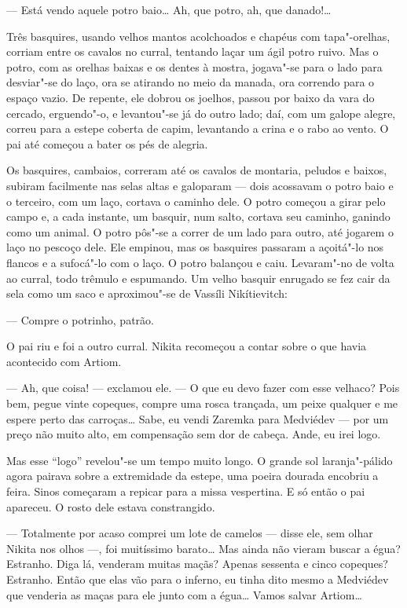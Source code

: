 --- Está vendo aquele potro baio\ldots{} Ah, que potro, ah, que danado!\ldots{}

Três basquires, usando velhos mantos acolchoados e chapéus com
tapa"-orelhas, corriam entre os cavalos no curral, tentando laçar um ágil
potro ruivo. Mas o potro, com as orelhas baixas e os dentes à mostra,
jogava"-se para o lado para desviar"-se do laço, ora se atirando no meio da
manada, ora correndo para o espaço vazio. De repente, ele dobrou os
joelhos, passou por baixo da vara do cercado, erguendo"-o, e levantou"-se
já do outro lado; daí, com um galope alegre, correu para a estepe
coberta de capim, levantando a crina e o rabo ao vento. O pai até
começou a bater os pés de alegria.

Os basquires, cambaios, correram até os cavalos de montaria, peludos e
baixos, subiram facilmente nas selas altas e galoparam --- dois
acossavam o potro baio e o terceiro, com um laço, cortava o caminho
dele. O potro começou a girar pelo campo e, a cada instante, um basquir,
num salto, cortava seu caminho, ganindo como um animal. O potro pôs"-se a
correr de um lado para outro, até jogarem o laço no pescoço dele.
Ele empinou, mas os basquires passaram a açoitá"-lo nos flancos e a
sufocá"-lo com o laço. O potro balançou e caiu. Levaram"-no de volta ao
curral, todo trêmulo e espumando. Um velho basquir enrugado se fez cair
da sela como um saco e aproximou"-se de Vassíli Nikítievitch:

--- Compre o potrinho, patrão.

O pai riu e foi a outro curral. Nikita recomeçou a contar sobre o que
havia acontecido com Artiom.

--- Ah, que coisa! --- exclamou ele. --- O que eu devo fazer com esse
velhaco? Pois bem, pegue vinte copeques, compre uma rosca trançada, um
peixe qualquer e me espere perto das carroças\ldots{} Sabe, eu vendi Zaremka
para Medviédev --- por um preço não muito alto, em compensação sem dor
de cabeça. Ande, eu irei logo.

Mas esse ``logo'' revelou"-se um tempo muito longo. O grande sol
laranja"-pálido agora pairava sobre a extremidade da estepe, uma poeira
dourada encobriu a feira. Sinos começaram a repicar para a missa
vespertina. E só então o pai apareceu. O rosto dele estava constrangido.

--- Totalmente por acaso comprei um lote de camelos --- disse ele, sem
olhar Nikita nos olhos ---, foi muitíssimo barato\ldots{} Mas ainda não
vieram buscar a égua? Estranho. Diga lá, venderam muitas maçãs? Apenas
sessenta e cinco copeques? Estranho. Então que elas vão para o inferno,
eu tinha dito mesmo a Medviédev que venderia as maças para ele junto com
a égua\ldots{} Vamos salvar Artiom\ldots{}

